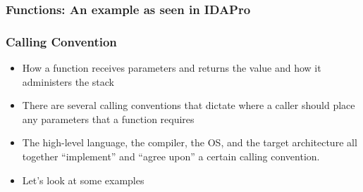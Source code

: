 \documentclass[]{beamer}
\begin{document}
\begin{frame}
  \frametitle{Functions: An example as seen in IDAPro}
  \begin{figure}
  \end{figure}
\end{frame}

\begin{frame}
  \frametitle{Calling Convention}
  \begin{itemize}
  \item{How a function receives parameters and returns the value and how it administers the stack}
  \item{There are several calling conventions that dictate where a caller should place any parameters that a function requires}
  \item{The high-level language, the compiler, the OS, and the target architecture all together ``implement'' and ``agree upon'' a certain calling convention.}
  \item{Let's look at some examples}
  \end{itemize}
\end{frame}
\end{document}
